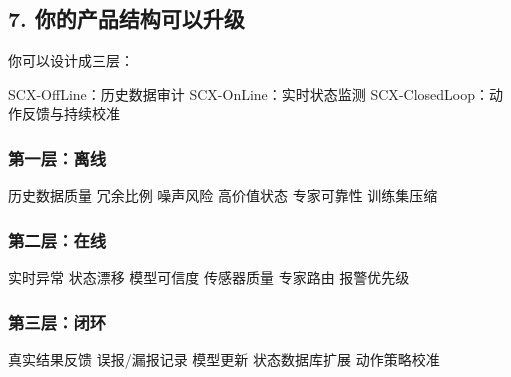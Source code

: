 \documentclass[
  12pt,
]{ctexart}
\newenvironment{Shaded}{}{}
\newcommand{\NormalTok}[1]{#1}
\begin{document}
\subsection{7.
你的产品结构可以升级}\label{ux4f60ux7684ux4ea7ux54c1ux7ed3ux6784ux53efux4ee5ux5347ux7ea7}

你可以设计成三层：

\begin{Shaded}
\begin{Highlighting}[]
\NormalTok{SCX{-}OffLine：历史数据审计}
\NormalTok{SCX{-}OnLine：实时状态监测}
\NormalTok{SCX{-}ClosedLoop：动作反馈与持续校准}
\end{Highlighting}
\end{Shaded}

\subsubsection{第一层：离线}\label{ux7b2cux4e00ux5c42ux79bbux7ebf}

\begin{Shaded}
\begin{Highlighting}[]
\NormalTok{历史数据质量}
\NormalTok{冗余比例}
\NormalTok{噪声风险}
\NormalTok{高价值状态}
\NormalTok{专家可靠性}
\NormalTok{训练集压缩}
\end{Highlighting}
\end{Shaded}

\subsubsection{第二层：在线}\label{ux7b2cux4e8cux5c42ux5728ux7ebf}

\begin{Shaded}
\begin{Highlighting}[]
\NormalTok{实时异常}
\NormalTok{状态漂移}
\NormalTok{模型可信度}
\NormalTok{传感器质量}
\NormalTok{专家路由}
\NormalTok{报警优先级}
\end{Highlighting}
\end{Shaded}

\subsubsection{第三层：闭环}\label{ux7b2cux4e09ux5c42ux95edux73af}

\begin{Shaded}
\begin{Highlighting}[]
\NormalTok{真实结果反馈}
\NormalTok{误报/漏报记录}
\NormalTok{模型更新}
\NormalTok{状态数据库扩展}
\NormalTok{动作策略校准}
\end{Highlighting}
\end{Shaded}
\end{document}
